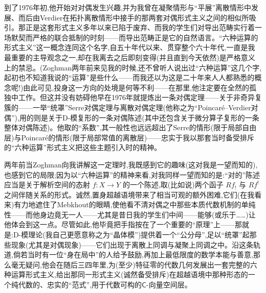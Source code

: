 \noindent 到了1976年初,他开始对对偶发生兴趣,并为我曾在凝聚情形与“平展”离散情形中发展、而后由Verdier在拓扑离散情形中接手的那两套对偶形式主义之间的相似所吸引。那正是这套形式主义多年以来已陷于废弃、而我的学生们对导出范畴实行着一场\dmark{}默契而严格的联合抵制的时刻——而导出范畴正是它的自然语言。“六种运算的形式主义”这一概念连同这个名字,自五十年代以来、贯穿整个六十年代,一直是我最重要的主导观念之一,却在我离去之后即刻变得(并且直到今天依然)是严格意义上的禁忌。(Zoghman两年前来见我的时候,还不曾听人说出过“六种运算”这几个字,起初也不知道我说的“运算”是些什么——而我还以为这是二十年来人人都熟悉的概念呢!)由此可见,投身这一方向的处境是何等不利——在那里,他注定要在全然的孤独中工作。但这并没有妨碍他早在1976年就提炼出一条对偶定理——关于非奇异复簇的——一举“统罩”Serre对偶定理与离散对偶定理(他称之为“Poincaré--Verdier对偶”),用的则是关于D-模复形的一条对偶陈述(其中还包含关于微分算子复形的一条整体对偶陈述)。他取的“系数”,其一般性也远远超出了Serre的情形(限于局部自由层)与Poincaré的情形(限于局部常值的离散层)——忠实于我以那套当时备受排斥的“六种运算”形式主义把这些主题引入时的精神。

\noindent 两年前当Zoghman向我讲解这一定理时,我既感到它的趣味(这对我是一望而知的),也感到它的局限;因为以“六种运算”的精神来看,对我同样一望而知的是:“对的”陈述应当是关于解析空间的态射 $f : X\to Y$ 的一个陈述,取(比如说)两个函子 $Rf_{!}$ 与 $Rf^{!}$ 之间伴随关系的形式。诚然,置身超越语境带来了相当可观的额外困难,它们(在我看来)有力地遮住了Mebkhout的眼睛,使他看不清对偶之中那些本质代数机制的单纯性——而他身边竟无一人——尤其是昔日我的学生们中间——能够(或乐于……)让他体会到这一点。尽管如此,他毕竟把手指按在了一个重要的“原理”上——那就是:D-模理论(我自己更愿意称之为“晶体模”)提供着一个“公分母”,足以“统罩”起\dmark{}那些现象(尤其是对偶现象)——它们出现于离散上同调与凝聚上同调之中。沿这条轨道,倘若当时有一位“身在局中”的人给予鼓励,再加上最低限度的数学本能与善意,那么毫无疑问,他会在随后三四年里,为(至少)特征零的代数几何发展出一套完整的六种运算形式主义,给出那同一形式主义(诚然备受排斥)在超越语境中那种形态的一个纯代数的、忠实的“范式”,用于代数可构的$\mathsf{C}$-向量空间层。

